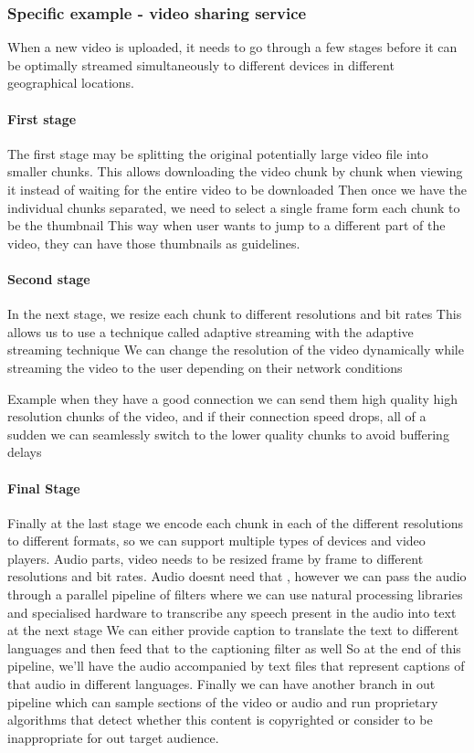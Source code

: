 \subsubsection{Specific example - video sharing service}
When a new video is uploaded, it needs to go through a few stages before it can be optimally streamed simultaneously to different devices in different geographical locations.

\paragraph{First stage}
The first stage may be splitting the original potentially large video file into smaller chunks.
This allows downloading the video chunk by chunk when viewing it instead of waiting for the entire video to be downloaded
Then once we have the individual chunks separated, we need to select a single frame form each chunk to be the thumbnail
This way when user wants to jump to a different part of the video, they can have those thumbnails as guidelines.

\paragraph{Second stage}
In the next stage, we resize each chunk to different resolutions and bit rates
This allows us to use a technique called adaptive streaming with the adaptive streaming technique
We can change the resolution of the video dynamically while streaming the video to the user depending on their network conditions

Example when they have a good connection we can send them high quality high resolution chunks of the video, and if their connection speed drops, all of a sudden we can seamlessly switch to the lower quality chunks to avoid buffering delays

\paragraph{Final Stage}
Finally at the last stage we encode each chunk in each of the different resolutions to different formats, so we can support multiple types of devices and video players.
Audio parts, video needs to be resized frame by frame to different resolutions and bit rates.
Audio doesnt need that , however we can pass the audio through a parallel pipeline of filters where we can use natural processing libraries and specialised hardware to transcribe any speech present in the audio into text at the next stage
We can either provide caption to translate the text to different languages and then feed that to the captioning filter as well
So at the end of this pipeline, we'll have the audio accompanied by text files that represent captions of that audio in different languages.
Finally we can have another branch in out pipeline which can sample sections of the video or audio and run proprietary algorithms that detect whether this content is copyrighted or consider to be inappropriate for out target audience.

